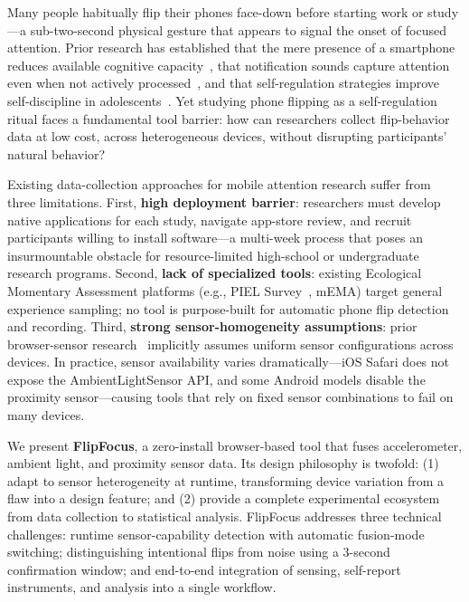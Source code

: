 \documentclass[sigconf]{acmart}
\begin{document}
Many people habitually flip their phones face-down before starting work or study---a sub-two-second physical gesture that appears to signal the onset of focused attention. Prior research has established that the mere presence of a smartphone reduces available cognitive capacity~\cite{ward2017brain}, that notification sounds capture attention even when not actively processed~\cite{stothart2015attentional}, and that self-regulation strategies improve self-discipline in adolescents~\cite{duckworth2011self}. Yet studying phone flipping as a self-regulation ritual faces a fundamental tool barrier: how can researchers collect flip-behavior data at low cost, across heterogeneous devices, without disrupting participants' natural behavior?

Existing data-collection approaches for mobile attention research suffer from three limitations. First, \textbf{high deployment barrier}: researchers must develop native applications for each study, navigate app-store review, and recruit participants willing to install software---a multi-week process that poses an insurmountable obstacle for resource-limited high-school or undergraduate research programs. Second, \textbf{lack of specialized tools}: existing Ecological Momentary Assessment platforms (e.g., PIEL Survey~\cite{kubiak2015piel}, mEMA) target general experience sampling; no tool is purpose-built for automatic phone flip detection and recording. Third, \textbf{strong sensor-homogeneity assumptions}: prior browser-sensor research~\cite{kuijpers2022browser} implicitly assumes uniform sensor configurations across devices. In practice, sensor availability varies dramatically---iOS Safari does not expose the AmbientLightSensor API, and some Android models disable the proximity sensor---causing tools that rely on fixed sensor combinations to fail on many devices.

We present \textbf{FlipFocus}, a zero-install browser-based tool that fuses accelerometer, ambient light, and proximity sensor data. Its design philosophy is twofold: (1) adapt to sensor heterogeneity at runtime, transforming device variation from a flaw into a design feature; and (2) provide a complete experimental ecosystem from data collection to statistical analysis. FlipFocus addresses three technical challenges: runtime sensor-capability detection with automatic fusion-mode switching; distinguishing intentional flips from noise using a 3-second confirmation window; and end-to-end integration of sensing, self-report instruments, and analysis into a single workflow.
\end{document}
